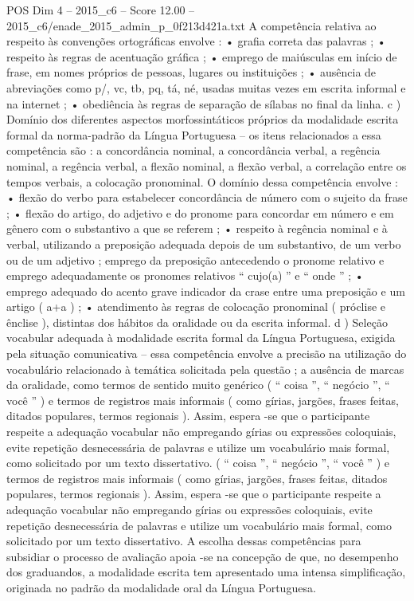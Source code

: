 \begin{textsample}{POS Dim 4 – 2015\_c6 – Score 12.00 – 2015\_c6/enade\_2015\_admin\_p\_0f213d421a.txt}
A competência relativa ao respeito às convenções ortográficas envolve : • grafia correta das palavras ; • respeito às regras de acentuação gráfica ; • emprego de maiúsculas em início de frase, em nomes próprios de pessoas, lugares ou instituições ; • ausência de abreviações como p/, vc, tb, pq, tá, né, usadas muitas vezes em escrita informal e na internet ; • obediência às regras de separação de sílabas no final da linha. c ) Domínio dos diferentes aspectos morfossintáticos próprios da modalidade escrita formal da norma-padrão da Língua Portuguesa – os itens relacionados a essa competência são : a concordância nominal, a concordância verbal, a regência nominal, a regência verbal, a flexão nominal, a flexão verbal, a correlação entre os tempos verbais, a colocação pronominal.
O domínio dessa competência envolve : • flexão do verbo para estabelecer concordância de número com o sujeito da frase ; • flexão do artigo, do adjetivo e do pronome para concordar em número e em gênero com o substantivo a que se referem ; • respeito à regência nominal e à verbal, utilizando a preposição adequada depois de um substantivo, de um verbo ou de um adjetivo ; emprego da preposição antecedendo o pronome relativo e emprego adequadamente os pronomes relativos “ cujo(a) ” e “ onde ” ; • emprego adequado do acento grave indicador da crase entre uma preposição e um artigo ( a+a ) ; • atendimento às regras de colocação pronominal ( próclise e ênclise ), distintas dos hábitos da oralidade ou da escrita informal. d ) Seleção vocabular adequada à modalidade escrita formal da Língua Portuguesa, exigida pela situação comunicativa – essa competência envolve a precisão na utilização do vocabulário relacionado à temática solicitada pela questão ; a ausência de marcas da oralidade, como termos de sentido muito genérico ( “ coisa ”, “ negócio ”, “ você ” ) e termos de registros mais informais ( como gírias, jargões, frases feitas, ditados populares, termos regionais ).
Assim, espera -se que o participante respeite a adequação vocabular não empregando gírias ou expressões coloquiais, evite repetição desnecessária de palavras e utilize um vocabulário mais formal, como solicitado por um texto dissertativo. ( “ coisa ”, “ negócio ”, “ você ” ) e termos de registros mais informais ( como gírias, jargões, frases feitas, ditados populares, termos regionais ).
Assim, espera -se que o participante respeite a adequação vocabular não empregando gírias ou expressões coloquiais, evite repetição desnecessária de palavras e utilize um vocabulário mais formal, como solicitado por um texto dissertativo.
A escolha dessas competências para subsidiar o processo de avaliação apoia -se na concepção de que, no desempenho dos graduandos, a modalidade escrita tem apresentado uma intensa simplificação, originada no padrão da modalidade oral da Língua Portuguesa.

\end{textsample}
